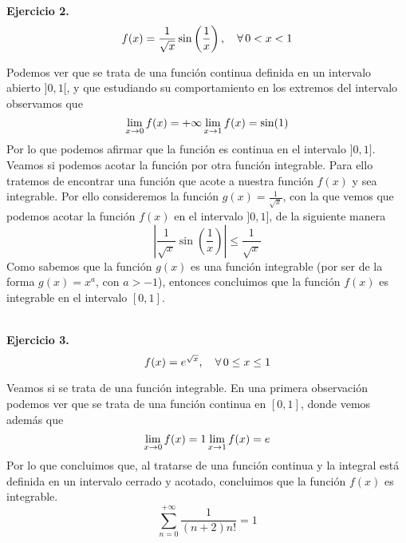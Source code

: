 \documentclass[fleqn]{article}
\begin{document}
    \newpage

    \textbf{Ejercicio 2.} \\
   
    $$f(x) = \frac{1}{\sqrt{x}}\sin \left( \frac{1}{x} \right), \quad \forall \thinspace 0 < x < 1$$
    
    Podemos ver que se trata de una función continua definida en un intervalo abierto $]0,1[$, y que estudiando su comportamiento en los extremos del intervalo 
    observamos que
    \begin{equation*}
        \lim_{x \to 0} f(x) = +\infty\\
        \lim_{x \to 1} f(x) = \sin(1)
    \end{equation*}
    Por lo que podemos afirmar que la función es continua en el intervalo $]0,1]$. Veamos si podemos acotar la función por otra función integrable. Para ello 
    tratemos de encontrar una función que acote a nuestra función $f(x)$ y sea integrable. Por ello consideremos la función $g(x) = \frac{1}{\sqrt{x}}$, con la que vemos que
    podemos acotar la función $f(x)$ en el intervalo $]0,1]$, de la siguiente manera
    $$\left| \frac{1}{\sqrt{x}}\sin \left( \frac{1}{x} \right) \right| \leq \frac{1}{\sqrt{x}}$$
    Como sabemos que la función $g(x)$ es una función integrable (por ser de la forma $g(x) = x^a$, con $a>-1$), entonces concluimos que la función $f(x)$ es integrable
    en el intervalo $[0,1]$.\\ \\

    \newpage

    \textbf{Ejercicio 3.} \\

    $$f(x) = e^{\sqrt{x}}, \quad \forall \thinspace 0 \leq x \leq 1$$

    Veamos si se trata de una función integrable. En una primera observación podemos ver que se trata de una función continua en $[0,1]$, donde vemos además que
    \begin{equation*}
        \lim_{x \to 0} f(x) = 1\\
        \lim_{x \to 1} f(x) = e
    \end{equation*}
    Por lo que concluimos que, al tratarse de una función continua y la integral está definida en un intervalo cerrado y acotado, concluimos que la función $f(x)$
    es integrable.
    $$\sum_{n=0}^{+\infty} \frac{1}{(n+2)n!} = 1$$
    
\end{document}
